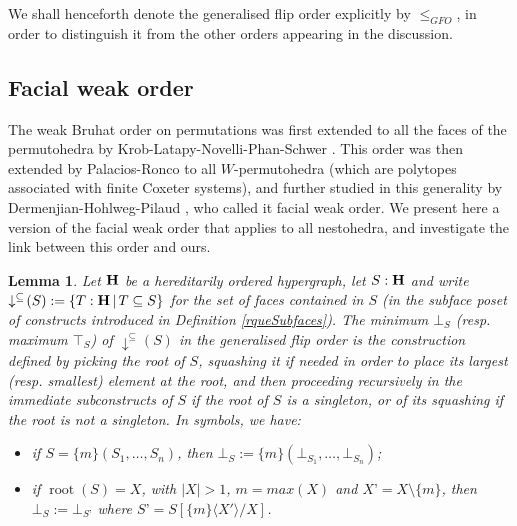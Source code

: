 \documentclass{article}
\theoremstyle{plain}
\newtheorem{lemma}[thm]{Lemma}
\theoremstyle{definition}
\newcommand{\set}[1]{\{#1\}}
\begin{document}
We shall henceforth denote the generalised flip order explicitly by $\leq_{GFO}$, in order to distinguish it from the other orders appearing in the discussion.

 
 
\subsection{Facial weak order}


The weak Bruhat order on permutations was first extended to all the faces of the permutohedra by Krob-Latapy-Novelli-Phan-Schwer \cite{KLNPS}. This order was then extended by Palacios-Ronco \cite{PalaciosRonco} to all $W$-permutohedra (which are polytopes associated with finite Coxeter systems), and further studied in this generality
by Dermenjian-Hohlweg-Pilaud \cite{DHP-WFO}, who called it facial weak order. We present here a version of the facial weak order that applies to all nestohedra, and investigate the link between this order and ours.

\begin{lemma}\label{lemmeWeak}
Let ${\bf H}$ be a hereditarily ordered hypergraph, let $S:{\bf H}$ and write $\downarrow^{\subseteq}\!({S}):=\{T:{\bf H}\,|\, T \subseteq S\}$ for the set of faces contained in $S$ (in the subface poset of constructs introduced in Definition \ref{rqueSubfaces}). 
The minimum $\bot_S$ (resp. maximum $\top_S$) of $\downarrow^{\subseteq}\!({S})$ in the generalised flip order is the construction defined by picking the root of $S$, squashing it if needed in order to place its 
largest (resp. smallest) element at the root, and then proceeding recursively in the immediate subconstructs of $S$ if the root of $S$ is a singleton, or of its squashing if the root is not a singleton.
In symbols, we have:
\begin{itemize}
\item
if 
$S = \set{m}(S_1,…,S_n)$, then 
$\bot_S:=\set{m}(\bot_{S_1},…,\bot_{S_n})$;
\item
if $\operatorname{root}(S) = X$, with $|X|>1$, $m=max(X)$ and $X’= X\setminus\set{m}$, then
$\bot_S := \bot_{S’}$ where $S’=S[\set{m}\langle X'\rangle/X]$.
\end{itemize}

\end{lemma}
\end{document}

